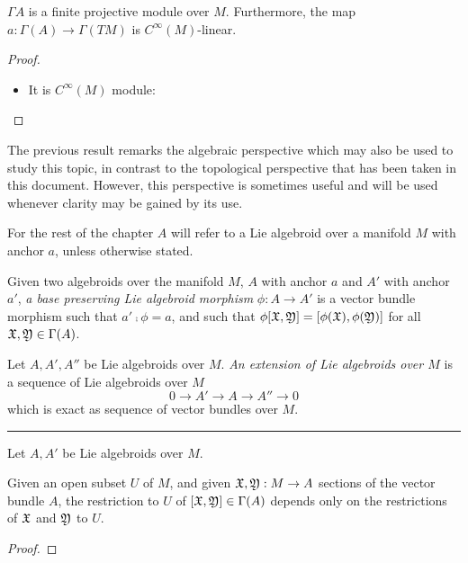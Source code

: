 \begin{proposition}
$\Gamma A$ is a finite projective module over $M$. Furthermore, the map $a: \Gamma(A) \to \Gamma(TM)$ is $C^\infty(M)$-linear.
\end{proposition}
\begin{proof}
\begin{itemize}
    \item It is $C^\infty(M)$ module:
\end{itemize}
\end{proof}

The previous result remarks the algebraic perspective which may also be used to study this topic, in contrast to the topological perspective that has been taken in this document. However, this perspective is sometimes useful and will be used whenever clarity may be gained by its use.

For the rest of the chapter $A$ will refer to a Lie algebroid over a manifold $M$ with anchor $a$, unless otherwise stated.

\begin{definition}  
Given two algebroids over the manifold $M$, $A$ with anchor $a$ and $A'$ with anchor $a'$, \emph{a base preserving Lie algebroid morphism} $\phi: A \to A'$ is a vector bundle morphism such that $a' \comp \phi = a $, and such that $\phi[\mathfrak{X}, \mathfrak{Y}] = [\phi(\mathfrak{X}), \phi(\mathfrak{Y})]$ for all $\mathfrak{X}, \mathfrak{Y} \in \Gamma(A)$. 
\end{definition}

\begin{definition} 
Let $A, A', A''$ be Lie algebroids over $M$. \emph{An extension of Lie algebroids over $M$} is a sequence of Lie algebroids over $M$ \[ 0 \to A' \to A \to A'' \to 0 \] which is exact as sequence of vector bundles over $M$.
\end{definition}

\rule{10cm}{1mm}

\begin{definition}
Let $A, A'$ be Lie algebroids over $M$. 
\end{definition}

\begin{proposition}
Given an open subset $U$ of $M$, and given $\mathfrak{X}, \mathfrak{Y} : M \to A$ sections of the vector bundle $A$, the restriction to $U$ of $[\mathfrak{X}, \mathfrak{Y}] \in \Gamma(A)$ depends only on the restrictions of $\mathfrak{X}$ and $\mathfrak{Y}$ to $U$.
\end{proposition}
\begin{proof}

\end{proof}

